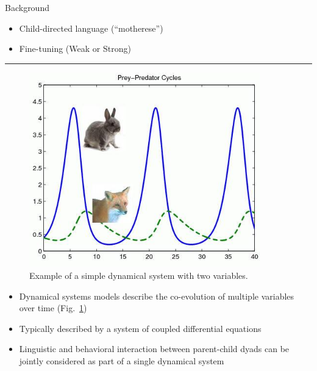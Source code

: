 \documentclass[final]{beamer}
\begin{document}
\begin{frame}{}
\begin{textblock}{22}
\begin{block}{Background}
\begin{itemize}
\item \text{ }Child-directed language (``motherese'')
\item \text{ }Fine-tuning \cite{Snow89, Sokolov93} (Weak or Strong)
\end{itemize}
\vspace{1cm}
\hrule
\vspace{1cm}
\begin{multicols}{2}
\text{ }
\begin{figure}
\includegraphics[width=10cm]{pred_prey.jpg}
\caption{Example of a simple dynamical system with two variables.}
\label{fig:predprey}
\end{figure}
\columnbreak
\small
\begin{itemize}
\item \text{ }Dynamical systems models describe the co-evolution of multiple variables over time (Fig.~\ref{fig:predprey})
\item \text{ }Typically described by a system of coupled differential equations
\item \text{ }Linguistic and behavioral interaction between parent-child dyads can be jointly considered as part of a single dynamical system \cite{VanGeert91}
\end{itemize}
\normalsize
\end{multicols}
\end{block}


\end{textblock}
\end{frame}
\end{document}
